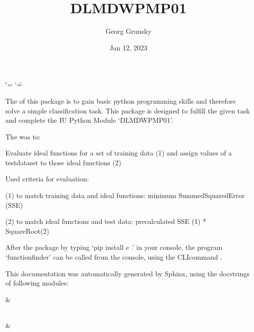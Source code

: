 \documentclass[letterpaper,10pt,english]{sphinxmanual}
\title{DLMDWPMP01}
\date{Jan 12, 2023}
\author{Georg Grunsky}
\begin{document}
\ifdefined\shorthandoff
  \ifnum\catcode`\=\string=\active\shorthandoff{=}\fi
  \ifnum\catcode`\"=\active{}\fi
\fi

\pagestyle{empty}
\sphinxmaketitle
\pagestyle{plain}
\sphinxtableofcontents
\pagestyle{normal}
\label{\detokenize{index::doc}}


\sphinxAtStartPar
The  of this package is to gain basic python programming skills
and therefore solve a simple classification task. This package is designed to
fulfill the given task and complete the IU Python Module ‘DLMDWPMP01’.

\sphinxAtStartPar
The  was to:

\sphinxAtStartPar
Evaluate ideal functions for a set of training data (1) and assign
values of a test\sphinxhyphen{}dataset to those ideal functions (2)

\sphinxAtStartPar
Used criteria for evaluation:

\sphinxAtStartPar
(1) to match training data and ideal functions:
minimum SummedSquaredError (SSE)

\sphinxAtStartPar
(2) to match ideal functions and test data:
precalculated SSE (1) * SquareRoot(2)

\sphinxAtStartPar
After  the package by typing ‘pip install \sphinxhyphen{}e .’ in your console, the
program ‘functionfinder’ can be called from the console, using the CLI\sphinxhyphen{}command .

\sphinxAtStartPar
This documentation was automatically generated by Sphinx, using the docstrings of following modules:


\begin{savenotes}\sphinxattablestart
\sphinxthistablewithglobalstyle
\sphinxthistablewithnovlinesstyle
\centering
\begin{tabulary}{\linewidth}[t]{}
\sphinxtoprule
\sphinxtableatstartofbodyhook
\sphinxAtStartPar
{\hyperref[\detokenize{_autosummary/functionfinder:module-functionfinder}]{}}
&
\sphinxAtStartPar

\\
\sphinxhline
\sphinxAtStartPar
{\hyperref[\detokenize{_autosummary/tests:module-tests}]{}}
&
\sphinxAtStartPar

\\
\sphinxbottomrule
\end{tabulary}
\sphinxtableafterendhook\par
\sphinxattableend\end{savenotes}
\end{document}
